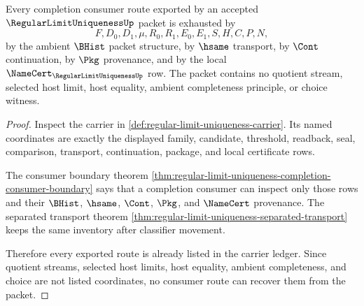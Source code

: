 \begin{theorem}
\label{thm:regular-limit-uniqueness-choice-free-ledger-exhaustion}
Every completion consumer route exported by an accepted $\RegularLimitUniquenessUp$ packet is exhausted by
$$
F,D_0,D_1,\mu,R_0,R_1,E_0,E_1,S,H,C,P,N,
$$
by the ambient $\BHist$ packet structure, by $\hsame$ transport, by $\Cont$ continuation, by $\Pkg$ provenance, and by the local $\NameCert_{\RegularLimitUniquenessUp}$ row. The packet contains no quotient stream, selected host limit, host equality, ambient completeness principle, or choice witness.
\end{theorem}
\begin{proof}
Inspect the carrier in \autoref{def:regular-limit-uniqueness-carrier}. Its named coordinates are exactly the displayed family, candidate, threshold, readback, seal, comparison, transport, continuation, package, and local certificate rows.

The consumer boundary theorem \autoref{thm:regular-limit-uniqueness-completion-consumer-boundary} says that a completion consumer can inspect only those rows and their $\BHist$, $\hsame$, $\Cont$, $\Pkg$, and $\NameCert$ provenance. The separated transport theorem \autoref{thm:regular-limit-uniqueness-separated-transport} keeps the same inventory after classifier movement.

Therefore every exported route is already listed in the carrier ledger. Since quotient streams, selected host limits, host equality, ambient completeness, and choice are not listed coordinates, no consumer route can recover them from the packet.
\end{proof}


